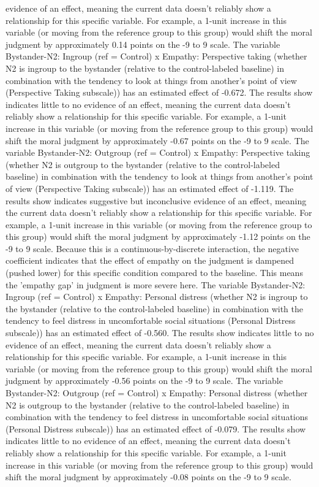 \documentclass[11pt]{article}
\begin{document}
evidence of an effect, meaning the current data doesn't reliably show a relationship for this specific variable. For example, a 1-unit increase in this variable (or moving from the reference group to this group) would shift the moral judgment by approximately 0.14 points on the -9 to 9 scale. The variable Bystander-N2: Ingroup (ref = Control) x Empathy: Perspective taking (whether N2 is ingroup to the bystander (relative to the control-labeled baseline) in combination with the tendency to look at things from another's point of view (Perspective Taking subscale)) has an estimated effect of -0.672. The results show indicates little to no evidence of an effect, meaning the current data doesn't reliably show a relationship for this specific variable. For example, a 1-unit increase in this variable (or moving from the reference group to this group) would shift the moral judgment by approximately -0.67 points on the -9 to 9 scale. The variable Bystander-N2: Outgroup (ref = Control) x Empathy: Perspective taking (whether N2 is outgroup to the bystander (relative to the control-labeled baseline) in combination with the tendency to look at things from another's point of view (Perspective Taking subscale)) has an estimated effect of -1.119. The results show indicates suggestive but inconclusive evidence of an effect, meaning the current data doesn't reliably show a relationship for this specific variable. For example, a 1-unit increase in this variable (or moving from the reference group to this group) would shift the moral judgment by approximately -1.12 points on the -9 to 9 scale. Because this is a continuous-by-discrete interaction, the negative coefficient indicates that the effect of empathy on the judgment is dampened (pushed lower) for this specific condition compared to the baseline. This means the 'empathy gap' in judgment is more severe here. The variable Bystander-N2: Ingroup (ref = Control) x Empathy: Personal distress (whether N2 is ingroup to the bystander (relative to the control-labeled baseline) in combination with the tendency to feel distress in uncomfortable social situations (Personal Distress subscale)) has an estimated effect of -0.560. The results show indicates little to no evidence of an effect, meaning the current data doesn't reliably show a relationship for this specific variable. For example, a 1-unit increase in this variable (or moving from the reference group to this group) would shift the moral judgment by approximately -0.56 points on the -9 to 9 scale. The variable Bystander-N2: Outgroup (ref = Control) x Empathy: Personal distress (whether N2 is outgroup to the bystander (relative to the control-labeled baseline) in combination with the tendency to feel distress in uncomfortable social situations (Personal Distress subscale)) has an estimated effect of -0.079. The results show indicates little to no evidence of an effect, meaning the current data doesn't reliably show a relationship for this specific variable. For example, a 1-unit increase in this variable (or moving from the reference group to this group) would shift the moral judgment by approximately -0.08 points on the -9 to 9 scale.
\end{document}
